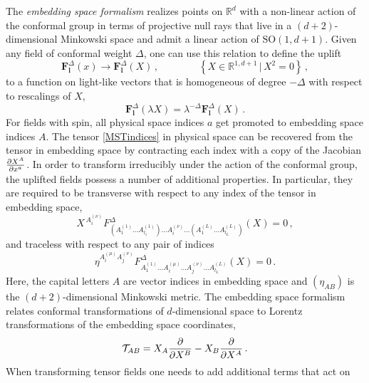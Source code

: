 \documentclass{article}
\begin{document}
The \textit{embedding space formalism} realizes points on $\mathbb{R}^d$ with a 
non-linear action of the conformal group in terms of projective null rays that 
live in a $(d+2)$-dimensional Minkowski space and admit a linear action of 
$\mathrm{SO}(1,d+1)$. Given any field of conformal weight $\Delta$, one can use 
this relation to define the uplift
\begin{equation}
    \mathbf{F}^\Delta_{\mathbf{l}}(x)\rightarrow \mathbf{F}^\Delta_{\mathbf{l}}(X)\,, 
    \qquad \qquad  \left\{X\in \mathbb{R}^{1,d+1}\,|\, X^2=0\right\}\,,
\end{equation} 
to a function on light-like vectors that is homogeneous of degree $-\Delta$ with respect 
to rescalings of $X$,
\begin{equation} \label{eq:confweight}
    \mathbf{F}_{\mathbf{l}}^{\Delta}(\lambda X)=\lambda^{-\Delta} 
    \mathbf{F}_{\mathbf{l}}^{\Delta}(X)\,. 
\end{equation}
For fields with spin, all physical space indices $a$ get promoted to embedding space 
indices $A$. The tensor \eqref{MSTindices} in physical space can be recovered from 
the tensor in embedding space by contracting each index with a copy of the Jacobian 
$\pdv{X^A}{x^a}$. In order to transform irreducibly under the action of the conformal 
group, the uplifted fields possess a number of additional properties. In particular, 
they are required to be transverse with respect to any index of the tensor in embedding space, 
\begin{equation}
    X^{\,A_i^{(\nu)}}F^{\Delta}_{\left(A^{(1)}_1 \dots A^{(1)}_{l_1}\right)\dots 
    A_i^{(\nu)}\dots \left(A^{(L)}_1\dots A^{(L)}_{l_L}\right)}(X)=0\,,
\end{equation}
and traceless with respect to any pair of indices 
\begin{equation}
    \eta^{A_i^{(\mu)}A_j^{(\nu)}}
    F^{\Delta}_{A^{(1)}_1 \dots A^{(\mu)}_{i}\dots A_j^{(\nu)}\dots A^{(L)}_{l_L}}(X)=0\,.
\end{equation}
Here, the capital letters $A$ are vector indices in embedding space and $(\eta_{AB})$ is the $(d+2)$-dimensional Minkowski metric. The embedding space formalism relates conformal 
transformations of $d$-dimensional space to Lorentz transformations of the embedding 
space coordinates,
\begin{equation}\label{generators-spacetime-part}
 \mathcal{T}_{AB}=X_A 
    \pdv{X^B}-X_{B}\pdv{X^A}\,.
\end{equation}
When transforming tensor fields one needs to add additional terms that act on 
\end{document}
